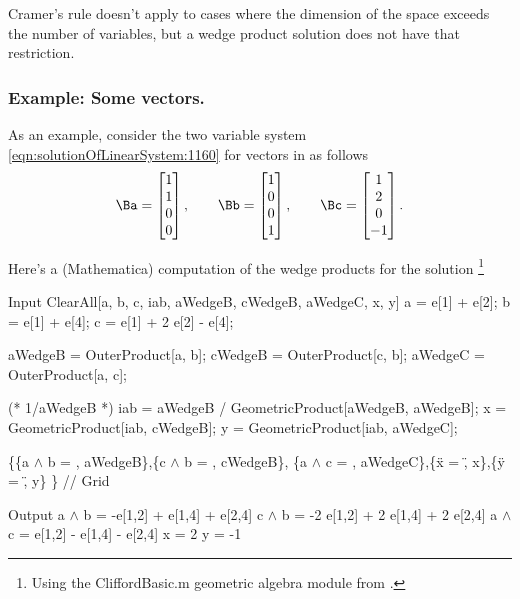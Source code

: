 Cramer's rule doesn't apply to cases where the dimension of the space exceeds the number of variables, but a wedge product solution does not have that restriction.
\subsubsection{Example: Some  vectors.}
As an example, consider the two variable system \cref{eqn:solutionOfLinearSystem:1160} for vectors in  as follows
\begin{equation}\label{eqn:solutionOfLinearSystem:1280}
\Ba =
\begin{bmatrix}
1 \\
1 \\
0 \\
0
\end{bmatrix}, \qquad
\Bb =
\begin{bmatrix}
1 \\
0 \\
0 \\
1
\end{bmatrix}, \qquad
\Bc =
\begin{bmatrix}
1 \\
2 \\
0 \\
-1
\end{bmatrix}.
\end{equation}

Here's a (Mathematica) computation of the wedge products for the solution
\footnote{%
Using the CliffordBasic.m geometric algebra module from \citep{jlaragonveraGeometricAlgebra}.%
}

\begin{mmaCell}[moredefined={a, b, c, iab, aWedgeB, cWedgeB, aWedgeC, x, y, e, OuterProduct, GeometricProduct}]{Input}
  ClearAll[a, b, c, iab, aWedgeB, cWedgeB, aWedgeC, x, y]
  a = e[1] + e[2];
  b = e[1] + e[4];
  c = e[1] + 2 e[2] - e[4];

  aWedgeB = OuterProduct[a, b];
  cWedgeB = OuterProduct[c, b];
  aWedgeC = OuterProduct[a, c];

  (* 1/aWedgeB *)
  iab = aWedgeB / GeometricProduct[aWedgeB, aWedgeB];
  x = GeometricProduct[iab, cWedgeB];
  y = GeometricProduct[iab, aWedgeC];

  \{\{a \(\pmb{\wedge}\) b = , aWedgeB\},\{c \(\pmb{\wedge}\) b = , cWedgeB\},
  \{a \(\pmb{\wedge}\) c = , aWedgeC\},\{\"x = \", x\},\{\"y = \", y\}
  \} // Grid
\end{mmaCell}
\begin{mmaCell}{Output}
  a \(\wedge\) b = 	-e[1,2] + e[1,4] + e[2,4]
  c \(\wedge\) b = 	-2 e[1,2] + 2 e[1,4] + 2 e[2,4]
  a \(\wedge\) c = 	e[1,2] - e[1,4] - e[2,4]
  x = 	2
  y = 	-1
\end{mmaCell}

